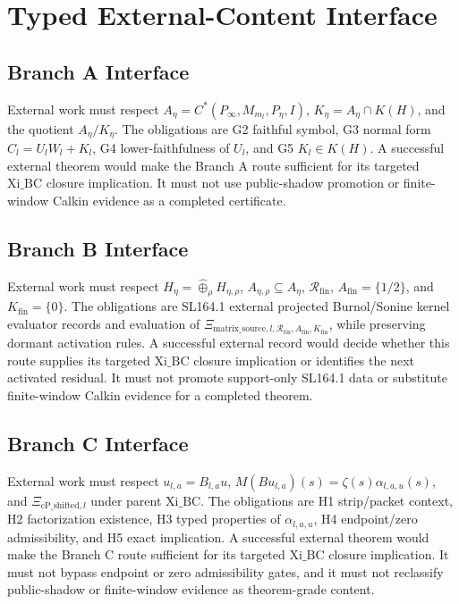 \documentclass[11pt]{article}
\newcommand{\Aeta}{A_\eta}
\newcommand{\Keta}{K_\eta}
\newcommand{\Rhofin}{\mathcal R_{\mathrm{fin}}}
\begin{document}
\section{Typed External-Content Interface}

\subsection{Branch A Interface}

External work must respect \(\Aeta=C^*(P_\infty,M_{m_l},P_\eta,I)\), \(\Keta=\Aeta\cap K(H)\), and the quotient \(\Aeta/\Keta\). The obligations are G2 faithful symbol, G3 normal form \(C_l=U_lW_l+K_l\), G4 lower-faithfulness of \(U_l\), and G5 \(K_l\in K(H)\). A successful external theorem would make the Branch A route sufficient for its targeted \(\mathrm{Xi\_BC}\) closure implication. It must not use public-shadow promotion or finite-window Calkin evidence as a completed certificate.

\subsection{Branch B Interface}

External work must respect \(H_\eta=\widehat{\oplus}_{\rho}H_{\eta,\rho}\), \(A_{\eta,\rho}\subseteq A_\eta\), \(\Rhofin\), \(A_{\mathrm{fin}}=\{1/2\}\), and \(K_{\mathrm{fin}}=\{0\}\). The obligations are SL164.1 external projected Burnol/Sonine kernel evaluator records and evaluation of \(\Xi_{\mathrm{matrix\_source},l,\Rhofin,A_{\mathrm{fin}},K_{\mathrm{fin}}}\), while preserving dormant activation rules. A successful external record would decide whether this route supplies its targeted \(\mathrm{Xi\_BC}\) closure implication or identifies the next activated residual. It must not promote support-only SL164.1 data or substitute finite-window Calkin evidence for a completed theorem.

\subsection{Branch C Interface}

External work must respect \(u_{l,a}=B_{l,a}u\), \(M(Bu_{l,a})(s)=\zeta(s)\alpha_{l,a,u}(s)\), and \(\Xi_{\mathrm{cP\_shifted},l}\) under parent \(\mathrm{Xi\_BC}\). The obligations are H1 strip/packet context, H2 factorization existence, H3 typed properties of \(\alpha_{l,a,u}\), H4 endpoint/zero admissibility, and H5 exact implication. A successful external theorem would make the Branch C route sufficient for its targeted \(\mathrm{Xi\_BC}\) closure implication. It must not bypass endpoint or zero admissibility gates, and it must not reclassify public-shadow or finite-window evidence as theorem-grade content.
\end{document}
